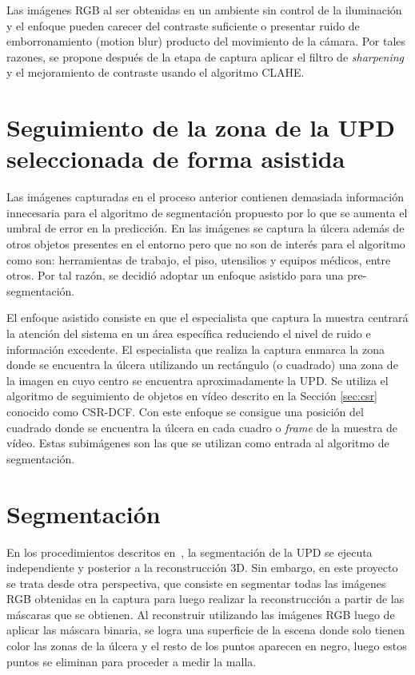 {Las imágenes RGB al ser obtenidas en un ambiente sin control de la iluminación y el enfoque pueden carecer del contraste suficiente o presentar ruido de emborronamiento (motion blur) producto del movimiento de la cámara. Por tales razones, se propone después de la etapa de captura aplicar el filtro de \textit{sharpening} y el mejoramiento de contraste usando el algoritmo CLAHE.



\section{Seguimiento de la zona de la UPD seleccionada de forma asistida}\label{segasis}

Las imágenes capturadas en el proceso anterior contienen demasiada información innecesaria para el algoritmo de segmentación propuesto por lo que se aumenta el umbral de error en la predicción. En las imágenes se captura la úlcera además de otros objetos presentes en el entorno pero que no son de interés para el algoritmo como son: herramientas de trabajo, el piso, utensilios y equipos médicos, entre otros. Por tal razón, se decidió adoptar un enfoque asistido para una pre-segmentación. 

El enfoque asistido consiste en que el especialista que captura la muestra centrará la atención del sistema en un área específica reduciendo el nivel de ruido e información excedente. El especialista que realiza la captura enmarca la zona donde se encuentra la úlcera utilizando un rectángulo (o cuadrado) una zona de la imagen en cuyo centro se encuentra aproximadamente la UPD. Se utiliza el algoritmo de seguimiento de objetos en vídeo descrito en la Sección \ref{sec:csr} conocido como CSR-DCF. Con este enfoque se consigue una posición del cuadrado donde se encuentra la úlcera en cada cuadro o \textit{frame} de la muestra de vídeo. Estas subimágenes son las que se utilizan como entrada al algoritmo de segmentación.

\section{Segmentación}

En los procedimientos descritos en~\cite{wang2014smartphone, filko2018wound}, la segmentación de la UPD se ejecuta independiente y posterior a la reconstrucción 3D. Sin embargo, en este proyecto se trata desde otra perspectiva, que consiste en segmentar todas las imágenes RGB obtenidas en la captura para luego realizar la reconstrucción a partir de las máscaras que se obtienen. Al reconstruir utilizando las imágenes RGB luego de aplicar las máscara binaria, se logra una superficie de la escena donde solo tienen color las zonas de la úlcera y el resto de los puntos aparecen en negro, luego estos puntos se eliminan para proceder a medir la malla.

}
